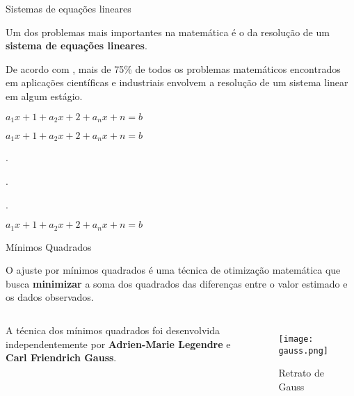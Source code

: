 \begin{frame}[t]{Sistemas de equações lineares} 

   Um dos problemas mais importantes na matemática é o da resolução de um \textbf{sistema de equações lineares}. 
   
   De acordo com \cite{leon2000algebra}, mais de 75\% de todos os problemas matemáticos encontrados em aplicações científicas e industriais envolvem a resolução de um sistema linear em algum estágio.

   \vspace*{0.45cm}

   \centering

   $a_{1}x+{1} + a_{2}x+{2} + a_{n}x+{n} = b$

   $a_{1}x+{1} + a_{2}x+{2} + a_{n}x+{n} = b$

   .

   .

   .

   $a_{1}x+{1} + a_{2}x+{2} + a_{n}x+{n} = b$

\end{frame}
\begin{frame}[t]{Mínimos Quadrados} 

    O ajuste por mínimos quadrados é uma técnica de otimização matemática que busca \textbf{minimizar} a soma dos quadrados das diferenças entre o valor estimado e os dados observados.
 
    \vspace*{0.45cm}
 
\begin{columns}[c]


    \centering


    \vspace*{0.4cm} 

    \centering
    A técnica dos mínimos quadrados foi desenvolvida independentemente por \textbf{Adrien-Marie Legendre} e \textbf{Carl Friendrich Gauss}.
   \centering
   \begin{figure}
    \texttt{[image: gauss.png]}
    \caption{Retrato de Gauss}
    \end{figure}
\end{columns}

 \end{frame}
